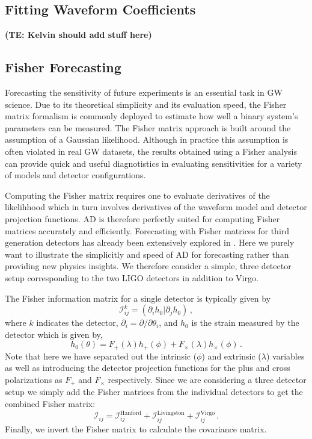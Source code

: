 \documentclass[twocolumn]{aastex631}
\newcommand{\te}[1]{\textbf{\color{pyGreen}(TE: #1)}}
\begin{document}
\subsection{Fitting Waveform Coefficients}
\label{subsec:hmc}

\te{Kelvin should add stuff here}

\subsection{Fisher Forecasting}
\label{subsec:hmc}

Forecasting the sensitivity of future experiments is an essential task in GW science.
Due to its theoretical simplicity and its evaluation speed, the Fisher matrix formalism is commonly deployed to estimate how well a binary system's parameters can be measured.
The Fisher matrix approach is built around the assumption of a Gaussian likelihood.
Although in practice this assumption is often violated in real GW datasets, the results obtained using a Fisher analysis can provide quick and useful diagnotistics in evaluating sensitivities for a variety of models and detector configurations.

Computing the Fisher matrix requires one to evaluate derivatives of the likelihhood which in turn involves derivatives of the waveform model and detector projection functions.
AD is therefore perfectly suited for computing Fisher matrices accurately and efficiently. 
Forecasting with Fisher matrices for third generation detectors has already been extensively explored in \citep{Iacovelli:2022bbs, Iacovelli:2022mbg}.
Here we purely want to illustrate the simplicitly and speed of AD for forecasting rather than providing new physics insights.
We therefore consider a simple, three detector setup corresponding to the two LIGO detectors in addition to Virgo.

The Fisher information matrix for a single detector is typically given by 
\begin{equation}
    \mathcal{I}^{k}_{ij} = (\partial_i h_0 | \partial_j h_0) \, ,
\end{equation}
where $k$ indicates the detector, $\partial_i = \partial/\partial \theta_i$, and $h_0$ is the strain measured by the detector which is given by,
\begin{equation}
    h_0(\theta) = F_+(\lambda) h_{+}(\phi) + F_\times(\lambda) h_{\times}(\phi) \, .
\end{equation}
Note that here we have separated out the intrinsic ($\phi$) and extrinsic ($\lambda$) variables as well as introducing the detector projection functions for the plus and cross polarizations as $F_+$ and $F_\times$ respectively.
Since we are considering a three detector setup we simply add the Fisher matrices from the individual detectors to get the combined Fisher matrix:
\begin{equation}
    \mathcal{I}_{ij} =  \mathcal{I}^{\mathrm{Hanford}}_{ij} + \mathcal{I}^{\mathrm{Livingston}}_{ij} + \mathcal{I}^{\mathrm{Virgo}}_{ij}   \, .
\end{equation}
Finally, we invert the Fisher matrix to calculate the covariance matrix.
\end{document}

